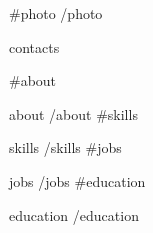 \documentclass[a4paper]{ReadableCV}
\begin{document}
\setlength{\parindent}{0pt}
\setlength{\emergencystretch}{3em}

{{#photo}}
{{/photo}}

{{contacts}}

\showHeader
{}
{{#about}}

{{about}}
{{/about}}
{{#skills}}

{{skills}}
{{/skills}}
{{#jobs}}

{{jobs}}
{{/jobs}}
{{#education}}

{{education}}
{{/education}}
\end{document}
